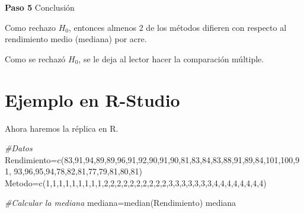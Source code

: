 \documentclass[
  a4paper,
  oneside,
  openany]{book}
\newenvironment{Shaded}{\begin{snugshade}}{\end{snugshade}}
\newcommand{\CommentTok}[1]{\textcolor[rgb]{0.56,0.35,0.01}{\textit{#1}}}
\newcommand{\DecValTok}[1]{\textcolor[rgb]{0.00,0.00,0.81}{#1}}
\newcommand{\FunctionTok}[1]{\textcolor[rgb]{0.00,0.00,0.00}{#1}}
\newcommand{\NormalTok}[1]{#1}
\newcommand{\OtherTok}[1]{\textcolor[rgb]{0.56,0.35,0.01}{#1}}
\begin{document}
\textbf{Paso 5} Conclusión

Como rechazo \(H_0\), entonces almenos 2 de los métodos difieren con respecto al rendimiento medio (mediana) por acre.

Como se rechazó \(H_0\), se le deja al lector hacer la comparación múltiple.

\hypertarget{ejemplo-en-r-studio-12}{%
\section{Ejemplo en R-Studio}\label{ejemplo-en-r-studio-12}}

Ahora haremos la réplica en R.

\begin{Shaded}
\begin{Highlighting}[]
\CommentTok{\#Datos}
\NormalTok{Rendimiento}\OtherTok{=}\FunctionTok{c}\NormalTok{(}\DecValTok{83}\NormalTok{,}\DecValTok{91}\NormalTok{,}\DecValTok{94}\NormalTok{,}\DecValTok{89}\NormalTok{,}\DecValTok{89}\NormalTok{,}\DecValTok{96}\NormalTok{,}\DecValTok{91}\NormalTok{,}\DecValTok{92}\NormalTok{,}\DecValTok{90}\NormalTok{,}\DecValTok{91}\NormalTok{,}\DecValTok{90}\NormalTok{,}\DecValTok{81}\NormalTok{,}\DecValTok{83}\NormalTok{,}\DecValTok{84}\NormalTok{,}\DecValTok{83}\NormalTok{,}\DecValTok{88}\NormalTok{,}\DecValTok{91}\NormalTok{,}\DecValTok{89}\NormalTok{,}\DecValTok{84}\NormalTok{,}\DecValTok{101}\NormalTok{,}\DecValTok{100}\NormalTok{,}\DecValTok{91}\NormalTok{,}
              \DecValTok{93}\NormalTok{,}\DecValTok{96}\NormalTok{,}\DecValTok{95}\NormalTok{,}\DecValTok{94}\NormalTok{,}\DecValTok{78}\NormalTok{,}\DecValTok{82}\NormalTok{,}\DecValTok{81}\NormalTok{,}\DecValTok{77}\NormalTok{,}\DecValTok{79}\NormalTok{,}\DecValTok{81}\NormalTok{,}\DecValTok{80}\NormalTok{,}\DecValTok{81}\NormalTok{)}
\NormalTok{Metodo}\OtherTok{=}\FunctionTok{c}\NormalTok{(}\DecValTok{1}\NormalTok{,}\DecValTok{1}\NormalTok{,}\DecValTok{1}\NormalTok{,}\DecValTok{1}\NormalTok{,}\DecValTok{1}\NormalTok{,}\DecValTok{1}\NormalTok{,}\DecValTok{1}\NormalTok{,}\DecValTok{1}\NormalTok{,}\DecValTok{1}\NormalTok{,}\DecValTok{2}\NormalTok{,}\DecValTok{2}\NormalTok{,}\DecValTok{2}\NormalTok{,}\DecValTok{2}\NormalTok{,}\DecValTok{2}\NormalTok{,}\DecValTok{2}\NormalTok{,}\DecValTok{2}\NormalTok{,}\DecValTok{2}\NormalTok{,}\DecValTok{2}\NormalTok{,}\DecValTok{2}\NormalTok{,}\DecValTok{3}\NormalTok{,}\DecValTok{3}\NormalTok{,}\DecValTok{3}\NormalTok{,}\DecValTok{3}\NormalTok{,}\DecValTok{3}\NormalTok{,}\DecValTok{3}\NormalTok{,}\DecValTok{3}\NormalTok{,}\DecValTok{4}\NormalTok{,}\DecValTok{4}\NormalTok{,}\DecValTok{4}\NormalTok{,}\DecValTok{4}\NormalTok{,}\DecValTok{4}\NormalTok{,}\DecValTok{4}\NormalTok{,}\DecValTok{4}\NormalTok{,}\DecValTok{4}\NormalTok{)}

\CommentTok{\#Calcular la mediana}
\NormalTok{mediana}\OtherTok{=}\FunctionTok{median}\NormalTok{(Rendimiento)}
\NormalTok{mediana}
\end{Highlighting}
\end{Shaded}
\end{document}

